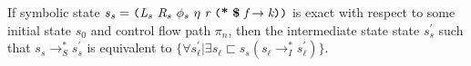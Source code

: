 %

\begin{lemma}
\label{lem:init}
If symbolic state $s_s = \lp \cfgnt{L}_s\ \cfgnt{R}_{s}\ \phi_s\ \eta\ \cfgnt{r}\ \lp \cfgt{*}\ \cfgt{\$}\ \cfgnt{f} \rightarrow \cfgnt{k}\rp \rp$ is exact with respect to some initial state $s_0$ and control flow path $\pi_n$, then the intermediate state state $s_s^\prime$ such that $s_s \rightarrow_S^* s_s^\prime$ is equivalent to $\{\forall s_\ell^\prime | \exists s_\ell \sqsubset s_s (s_\ell \rightarrow_I^* s_\ell^\prime)  \}$.
\end{lemma}

